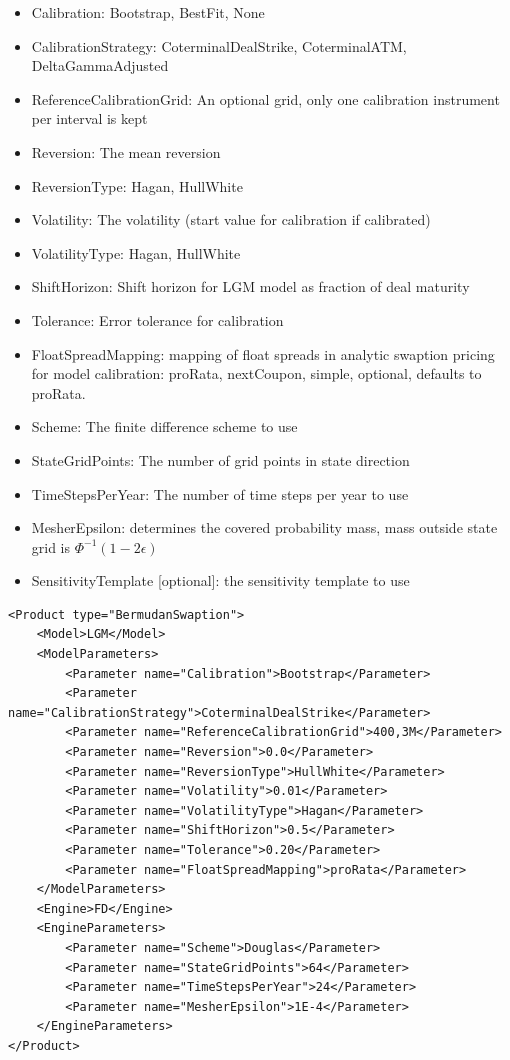 \begin{itemize}
\item Calibration: Bootstrap, BestFit, None
\item CalibrationStrategy: CoterminalDealStrike, CoterminalATM, DeltaGammaAdjusted
\item ReferenceCalibrationGrid: An optional grid, only one calibration instrument per interval is kept
\item Reversion: The mean reversion
\item ReversionType: Hagan, HullWhite
\item Volatility: The volatility (start value for calibration if calibrated)
\item VolatilityType: Hagan, HullWhite
\item ShiftHorizon: Shift horizon for LGM model as fraction of deal maturity
\item Tolerance: Error tolerance for calibration
\item FloatSpreadMapping: mapping of float spreads in analytic swaption pricing for model calibration: proRata,
  nextCoupon, simple, optional, defaults to proRata.
\item Scheme: The finite difference scheme to use
\item StateGridPoints: The number of grid points in state direction
\item TimeStepsPerYear: The number of time steps per year to use
\item MesherEpsilon: determines the covered probability mass, mass outside state grid is $\Phi^{-1}(1-2\epsilon)$
\item SensitivityTemplate [optional]: the sensitivity template to use
\end{itemize}

\begin{longlisting}
\begin{verbatim}
<Product type="BermudanSwaption">
    <Model>LGM</Model>
    <ModelParameters>
        <Parameter name="Calibration">Bootstrap</Parameter>
        <Parameter name="CalibrationStrategy">CoterminalDealStrike</Parameter>
        <Parameter name="ReferenceCalibrationGrid">400,3M</Parameter>
        <Parameter name="Reversion">0.0</Parameter>
        <Parameter name="ReversionType">HullWhite</Parameter>
        <Parameter name="Volatility">0.01</Parameter>
        <Parameter name="VolatilityType">Hagan</Parameter>
        <Parameter name="ShiftHorizon">0.5</Parameter>
        <Parameter name="Tolerance">0.20</Parameter>
        <Parameter name="FloatSpreadMapping">proRata</Parameter>
    </ModelParameters>
    <Engine>FD</Engine>
    <EngineParameters>
        <Parameter name="Scheme">Douglas</Parameter>
        <Parameter name="StateGridPoints">64</Parameter>
        <Parameter name="TimeStepsPerYear">24</Parameter>
        <Parameter name="MesherEpsilon">1E-4</Parameter>
    </EngineParameters>
</Product>
\end{verbatim}
\caption{Configuration for Product BermudanSwaption, Model LGM, Engine FD}
\label{lst:peconfig_BermudanSwaption_LGM_FD}
\end{longlisting}

